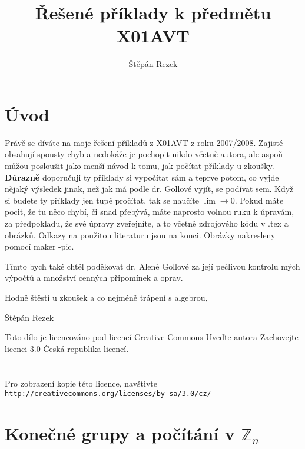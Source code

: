 \documentclass{article}
\title{Řešené příklady k předmětu X01AVT}
\author{Štěpán Rezek}
\begin{document}
\maketitle

\section*{Úvod}
Právě se díváte na moje řešení příkladů z X01AVT z roku 2007/2008. Zajisté obsahují spousty chyb a nedokáže je pochopit nikdo včetně autora, ale aspoň můžou posloužit jako menší návod k tomu, jak počítat příklady u zkoušky. \textbf{Důrazně} doporučuji ty příklady si vypočítat sám a teprve potom, co vyjde nějaký výsledek jinak, než jak má podle dr. Gollové vyjít, se podívat sem. Když si budete ty příklady jen tupě pročítat, tak se naučíte $\lim \rightarrow 0$. Pokud máte pocit, že tu něco chybí, či snad přebývá, máte naprosto volnou ruku k úpravám, za předpokladu, že své úpravy zveřejníte, a to včetně zdrojového kódu v .tex a obrázků. Odkazy na použitou literaturu jsou na konci. Obrázky nakresleny pomocí maker \Xy-pic.

Tímto bych také chtěl poděkovat dr. Aleně Gollové za její pečlivou kontrolu mých výpočtů a množství cenných připomínek a oprav.

Hodně štěstí u zkoušek a co nejméně trápení s algebrou,
\begin{flushright}
Štěpán Rezek
\end{flushright}

\vspace*{8cm}
\begin{flushleft}
Toto dílo je licencováno pod licencí Creative Commons Uveďte autora-Zachovejte licenci 3.0 Česká republika licencí. \\

\byncsa\\
\ \\
Pro zobrazení kopie této licence, navštivte 
{\tt http://creativecommons.org/licenses/by-sa/3.0/cz/}
\end{flushleft}
\clearpage

\tableofcontents

\clearpage

\section{Konečné grupy a počítání v $\mathbb{Z}_n$}

\end{document}

